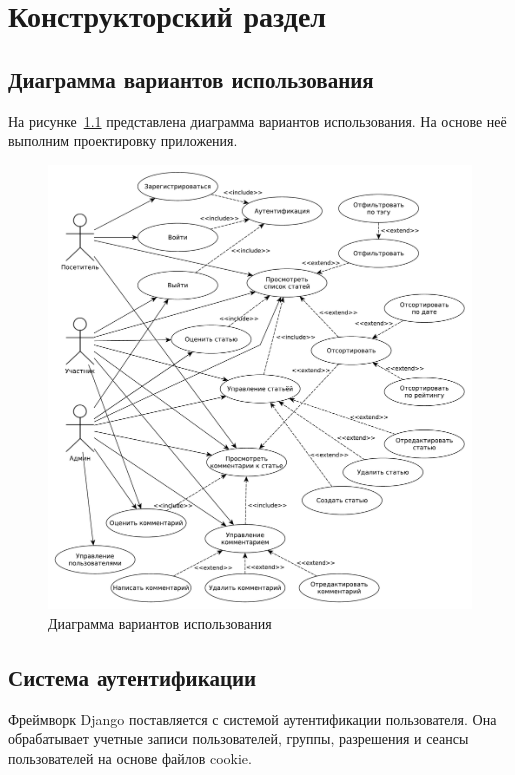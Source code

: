 \chapter{Конструкторский раздел}

\section{Диаграмма вариантов использования}

На рисунке~\ref{img:use-case} представлена диаграмма вариантов использования.
На основе неё выполним проектировку приложения.

\begin{figure}[H]
	\centering
	\includegraphics[scale=0.5]{inc/img/use-case}
	\caption{Диаграмма вариантов использования}
	\label{img:use-case}
\end{figure}

\section{Система аутентификации}

Фреймворк Django поставляется с системой аутентификации пользователя.
Она обрабатывает учетные записи пользователей, группы, разрешения и сеансы пользователей на основе файлов cookie.

